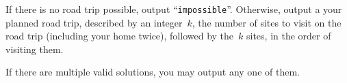 
    If there is no road trip possible, output ``\texttt{impossible}''.
    Otherwise, output a your planned road trip,
    described by an integer~$k$, the number of sites to visit on the road trip (including your home twice),
    followed by the~$k$ sites, in the order of visiting them.

    If there are multiple valid solutions, you may output any one of them.

